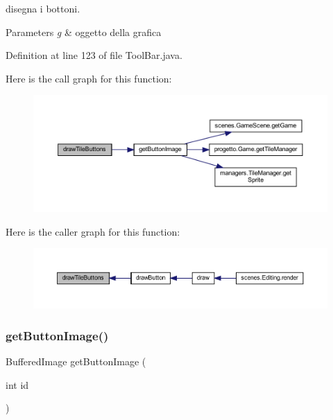 disegna i bottoni. 


\begin{DoxyParams}{Parameters}
{\em g} & oggetto della grafica \\
\hline
\end{DoxyParams}


Definition at line 123 of file Tool\+Bar.\+java.

Here is the call graph for this function\+:
\nopagebreak
\begin{figure}[H]
\begin{center}
\leavevmode
\includegraphics[width=350pt]{classui_1_1_tool_bar_a55c79e1185fb66ae98edacc2c7d5c302_cgraph}
\end{center}
\end{figure}
Here is the caller graph for this function\+:\nopagebreak
\begin{figure}[H]
\begin{center}
\leavevmode
\includegraphics[width=350pt]{classui_1_1_tool_bar_a55c79e1185fb66ae98edacc2c7d5c302_icgraph}
\end{center}
\end{figure}
\mbox{\label{classui_1_1_tool_bar_abe2e2af5c0d57248464e8b607c41a36f}} 
\subsubsection{\texorpdfstring{get\+Button\+Image()}{getButtonImage()}}
{\footnotesize\ttfamily Buffered\+Image get\+Button\+Image (\begin{DoxyParamCaption}\item[{int}]{id }\end{DoxyParamCaption})}



